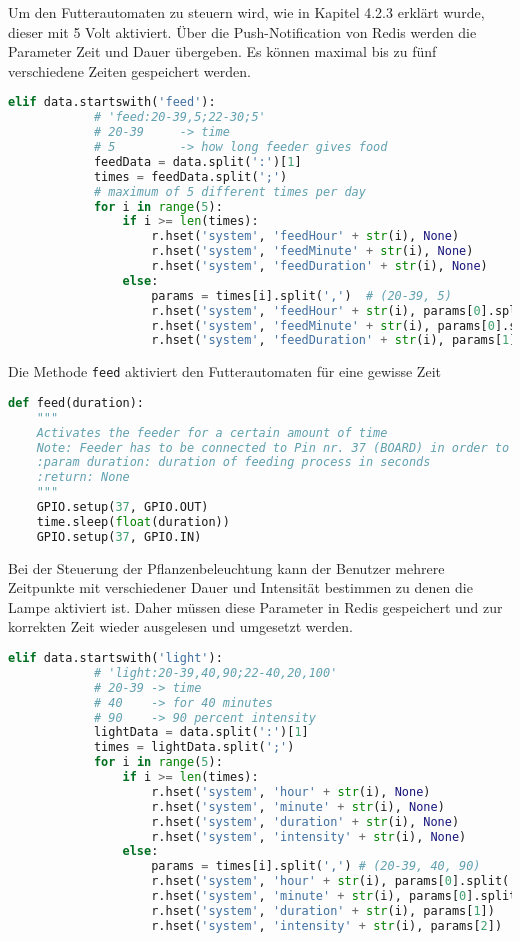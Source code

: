 Um den Futterautomaten zu steuern wird, wie in Kapitel 4.2.3 erklärt wurde, dieser mit 5 Volt aktiviert. Über die Push-Notification von Redis werden die Parameter Zeit und Dauer übergeben. Es können maximal bis zu fünf verschiedene Zeiten gespeichert werden.
\begin{lstlisting}[language=Python, caption=Steuern des Futterautomaten]
        elif data.startswith('feed'):
            # 'feed:20-39,5;22-30;5'
            # 20-39     -> time
            # 5         -> how long feeder gives food
            feedData = data.split(':')[1]
            times = feedData.split(';')
            # maximum of 5 different times per day
            for i in range(5):
                if i >= len(times):
                    r.hset('system', 'feedHour' + str(i), None)
                    r.hset('system', 'feedMinute' + str(i), None)
                    r.hset('system', 'feedDuration' + str(i), None)
                else:
                    params = times[i].split(',')  # (20-39, 5)
                    r.hset('system', 'feedHour' + str(i), params[0].split('-')[0])
                    r.hset('system', 'feedMinute' + str(i), params[0].split('-')[1])
                    r.hset('system', 'feedDuration' + str(i), params[1])
\end{lstlisting}
Die Methode \texttt{feed} aktiviert den Futterautomaten für eine gewisse Zeit
\begin{lstlisting}[language=Python]
def feed(duration):
    """
    Activates the feeder for a certain amount of time
    Note: Feeder has to be connected to Pin nr. 37 (BOARD) in order to work properly
    :param duration: duration of feeding process in seconds
    :return: None
    """
    GPIO.setup(37, GPIO.OUT)
    time.sleep(float(duration))
    GPIO.setup(37, GPIO.IN)
\end{lstlisting}
\newpage
Bei der Steuerung der Pflanzenbeleuchtung kann der Benutzer mehrere Zeitpunkte mit verschiedener Dauer und Intensität bestimmen zu denen die Lampe aktiviert ist. Daher müssen diese Parameter in Redis gespeichert und zur korrekten Zeit wieder ausgelesen und umgesetzt werden.
\begin{lstlisting}[language=Python, caption=Speichern der Beleuchtungsparameter]
        elif data.startswith('light'):
            # 'light:20-39,40,90;22-40,20,100'
            # 20-39 -> time
            # 40    -> for 40 minutes
            # 90    -> 90 percent intensity
            lightData = data.split(':')[1]
            times = lightData.split(';')
            for i in range(5):
                if i >= len(times):
                    r.hset('system', 'hour' + str(i), None)
                    r.hset('system', 'minute' + str(i), None)
                    r.hset('system', 'duration' + str(i), None)
                    r.hset('system', 'intensity' + str(i), None)
                else:
                    params = times[i].split(',') # (20-39, 40, 90)
                    r.hset('system', 'hour' + str(i), params[0].split('-')[0])
                    r.hset('system', 'minute' + str(i), params[0].split('-')[1])
                    r.hset('system', 'duration' + str(i), params[1])
                    r.hset('system', 'intensity' + str(i), params[2])
\end{lstlisting}
